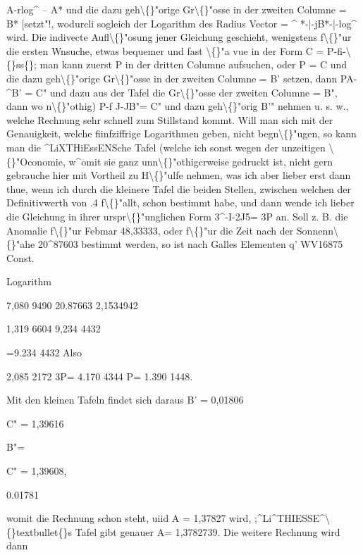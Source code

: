 \documentclass[10pt,a4paper]{article}
\begin{document}
A-rlog\textasciicircum{} -- A* und die dazu geh\textbackslash\{\}"orige Gr\textbackslash\{\}"osse in der zweiten Columne = B*
[setzt"!, wodurcli sogleich der Logarithm des Radius Vector = \textasciicircum{} *-|-jB*-|-log\textasciicircum{}
wird.
Die indivecte Aufl\textbackslash\{\}"osung jener Gleichung geschieht, wenigstens f\textbackslash\{\}"ur die
ersten Wnsuche, etwas bequemer und fast \textbackslash\{\}"a vue in der Form C = P-fi-\textbackslash\{\}ss\{\};
man kann zuerst P in der dritten Columne aufsuchen, oder P = C und die
dazu geh\textbackslash\{\}"orige Gr\textbackslash\{\}"osse in der zweiten Columne = B' setzen, dann PA-\textasciicircum{}B' = C"
und dazu aus der Tafel die Gr\textbackslash\{\}"osse der zweiten Columne = B", dann wo n\textbackslash\{\}"othig)
P-f J-JB"= C" und dazu geh\textbackslash\{\}"orig B'" nehmen u. s. w., welche Rechnung sehr
schnell zum Stillstand kommt. Will man sich mit der Genauigkeit, welche fiinfziffrige Logarithmen geben, nicht begn\textbackslash\{\}"ugen, so kann man die \textasciicircum{}LiXTHiEssENSche
Tafel (welche ich sonst wegen der unzeitigen \textbackslash\{\}"Oconomie, w\textasciicircum{}omit sie ganz unn\textbackslash\{\}"othigcrweise gedruckt ist, nicht gern gebrauche hier mit Vortheil zu H\textbackslash\{\}"ulfe
nehmen, was ich aber lieber erst dann thue, wenn ich durch die kleinere
Tafel die beiden Stellen, zwischen welchen der Definitivwerth von .4 f\textbackslash\{\}"allt,
schon bestimmt habe, und dann wende ich lieber die Gleichung in ihrer urspr\textbackslash\{\}"unglichen Form 3\textasciicircum{}-I-2J5= 3P an.
Soll z. B. die Anomalie f\textbackslash\{\}"ur Febmar 48,33333, oder f\textbackslash\{\}"ur die Zeit nach
der Sonnenn\textbackslash\{\}"ahe 20\textasciicircum{}87603 bestimmt werden, so ist nach Galles Elementen
q'
WV16875
Const.

Logarithm

7,080 9490
20.87663
2,1534942

1,319 6604
9,234 4432

=9.234 4432
Also

2,085 2172
3P= 4.170 4344
P= 1.390 1448.

Mit den kleinen Tafeln findet sich daraus
B' = 0,01806

C" = 1,39616

B"=

C" = 1,39608,

0.01781

womit die Rechnung schon steht, uiid A = 1,37827 wird, ;\textasciicircum{}Li\textasciicircum{}THIESSE\textasciicircum{}\textbackslash\{\}textbullet\{\}s Tafel
gibt genauer A= 1,3782739.
Die weitere Rechnung wird dann
\end{document}
